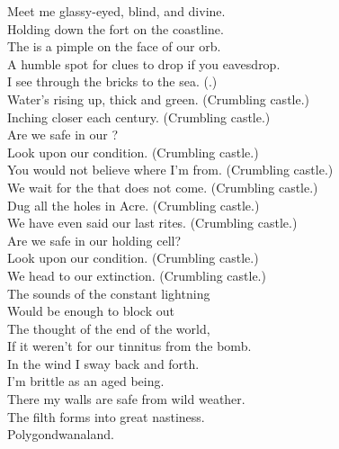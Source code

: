 
\label{album:polygondwanaland}





Meet me glassy-eyed, blind, and divine. \\
Holding down the fort on the coastline. \\
The  is a pimple on the face of our orb. \\
A humble spot for clues to drop if you eavesdrop. \\

I see through the bricks to the sea. (.) \\
Water's rising up, thick and green. (Crumbling castle.) \\
Inching closer each century. (Crumbling castle.) \\

Are we safe in our ? \\
Look upon our condition. (Crumbling castle.) \\
You would not believe where I'm from. (Crumbling castle.) \\

We wait for the  that does not come. (Crumbling castle.) \\
Dug all the holes in  Acre. (Crumbling castle.) \\
We have even said our last rites. (Crumbling castle.) \\

Are we safe in our holding cell? \\
Look upon our condition. (Crumbling castle.) \\
We head to our extinction. (Crumbling castle.) \\

The sounds of the constant lightning \\
Would be enough to block out \\
The thought of the end of the world, \\
If it weren't for our tinnitus from the bomb. \\

In the wind I sway back and forth. \\
I'm brittle as an aged  being. \\
There my walls are safe from wild weather. \\
The filth forms into great nastiness. \\
Polygondwanaland. \\

